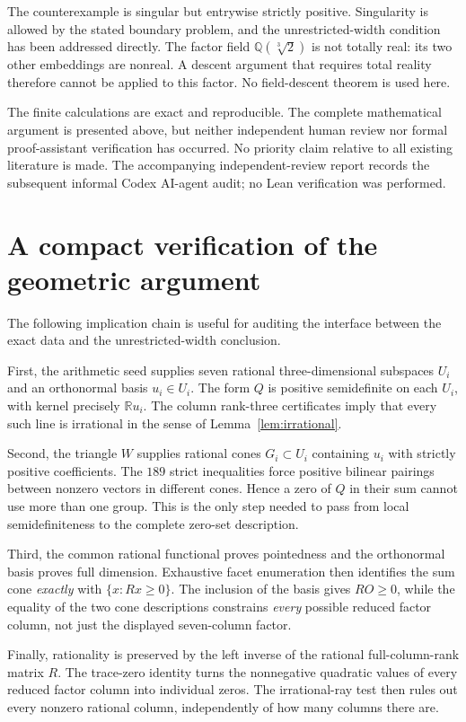 \documentclass[11pt]{article}
\theoremstyle{definition}
\newcommand{\R}{\mathbb R}
\newcommand{\Q}{\mathbb Q}
\numberwithin{equation}{section}
\begin{document}
The counterexample is singular but entrywise strictly positive. Singularity
is allowed by the stated boundary problem, and the unrestricted-width
condition has been addressed directly. The factor field
$\Q(\sqrt[3]{2})$ is not totally real: its two other embeddings are
nonreal. A descent argument that requires total reality therefore cannot
be applied to this factor. No field-descent theorem is used here.

The finite calculations are exact and reproducible. The complete
mathematical argument is presented above, but neither independent human
review nor formal proof-assistant verification has occurred. No priority
claim relative to all existing literature is made. The accompanying
independent-review report records the subsequent informal Codex AI-agent
audit; no Lean verification was performed.

\appendix
\section{A compact verification of the geometric argument}
The following implication chain is useful for auditing the interface
between the exact data and the unrestricted-width conclusion.

First, the arithmetic seed supplies seven rational three-dimensional
subspaces $U_i$ and an orthonormal basis $u_i\in U_i$. The form $Q$ is
positive semidefinite on each $U_i$, with kernel precisely $\R u_i$.
The column rank-three certificates imply that every such line is
irrational in the sense of Lemma~\ref{lem:irrational}.

Second, the triangle $W$ supplies rational cones $G_i\subset U_i$ containing
$u_i$ with strictly positive coefficients. The $189$ strict inequalities
force positive bilinear pairings between nonzero vectors in different
cones. Hence a zero of $Q$ in their sum cannot use more than one group.
This is the only step needed to pass from local semidefiniteness to the
complete zero-set description.

Third, the common rational functional proves pointedness and the
orthonormal basis proves full dimension. Exhaustive facet enumeration
then identifies the sum cone \emph{exactly} with $\{x:Rx\geq0\}$.
The inclusion of the basis gives $RO\geq0$, while the equality of the two
cone descriptions constrains \emph{every} possible reduced factor column,
not just the displayed seven-column factor.

Finally, rationality is preserved by the left inverse of the rational
full-column-rank matrix $R$. The trace-zero identity turns the nonnegative
quadratic values of every reduced factor column into individual zeros.
The irrational-ray test then rules out every nonzero rational column,
independently of how many columns there are.
\end{document}
